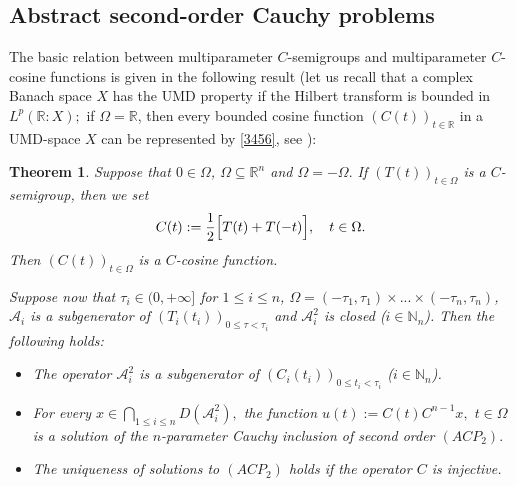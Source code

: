 \documentclass{amsart}
\newtheorem{thm}{Theorem}[section]
\theoremstyle{definition}
\theoremstyle{remark}
\numberwithin{equation}{section}
\begin{document}
\subsection{Abstract second-order Cauchy problems}\label{gsd}

The basic relation between multiparameter $C$-semigroups and multiparameter $C$-cosine functions is given in the following result (let us recall that a complex Banach space $X$ has
the UMD property if the Hilbert
transform is bounded in $L^{p}({\mathbb R}: X);$ if $\Omega={\mathbb R}$, then every bounded
cosine function $(C(t))_{t\in {\mathbb R}}$ in a UMD-space $X$ can be represented by \eqref{3456}, see \cite[Section 3.16]{a43}):

\begin{thm}\label{emoj}
Suppose that $0\in \Omega$, $\Omega  \subseteq {\mathbb R}^{n} $ and $\Omega=-\Omega.$ If $(T(t))_{t\in \Omega}$ is a $C$-semigroup, then we set
\begin{align}\label{3456}
C(t):=\frac{1}{2}\Bigl[ T(t)+T(-t)\Bigr],\quad t\in \Omega .
\end{align}
Then $(C(t))_{t\in \Omega}$ is a $C$-cosine function. 

Suppose now that $\tau_{i}\in (0,+\infty]$ for $1\leq i \leq n$, $\Omega =(-\tau_{1},\tau_{1}) \times ... \times (-\tau_{n},\tau_{n})$, ${\mathcal A}_{i}$ is a subgenerator of $(T_{i}(t_{i}) )_{0\leq \tau <\tau_{i}}$ 
and
${\mathcal A}_{i}^{2}$ is closed ($i\in  {\mathbb N}_{n}$). Then the following holds:
\begin{itemize}
\item[(i)] The operator
${\mathcal A}_{i}^{2}$ is
a subgenerator of
$(C_{i}(t_{i}) )_{0\leq t_{i} <\tau_{i}}$ ($i\in  {\mathbb N}_{n}$).
\item[(ii)] For every $x\in \bigcap_{1\leq i \leq n}D({\mathcal A}_{i}^{2}),$ the function $u(t):=C(t)C^{n-1}x,$ $t\in \Omega$ is a solution of the $n$-parameter Cauchy inclusion of second order $(ACP_{2}).$ 
\item[(iii)] The uniqueness of solutions to $(ACP_{2})$ holds if the operator $C$ is injective.
\end{itemize}
\end{thm}
\end{document}

